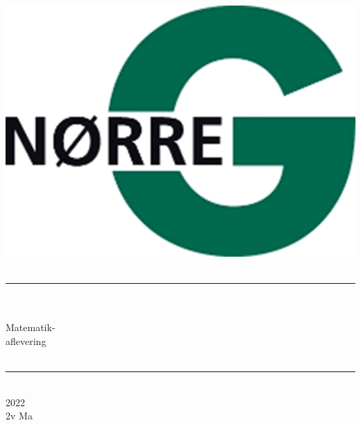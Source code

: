 \documentclass[12pt,x11names,a4paper]{article}
\begin{document}
%

\begin{titlepage}

\begin{minipage}{0.27\textwidth}

\end{minipage}
\begin{minipage}{0.73\textwidth}
\begin{center}
\phantom{h} \vspace{1cm}\\
\hspace{4cm}
\includegraphics[scale = 1]{Billeder/Norreg.png} \\
\phantom{h} \vspace{5cm}\\
\rule{0.7\textwidth}{0.3mm}\\
\phantom{h}\\
{\fontsize{50}{60}\selectfont Matematik-\\aflevering}\\
\phantom{h}\\
\rule{0.7\textwidth}{0.3mm}\\
\Large 2022\\
\Large 2v Ma

\end{center}
\end{minipage}
\end{titlepage}
\end{document}
